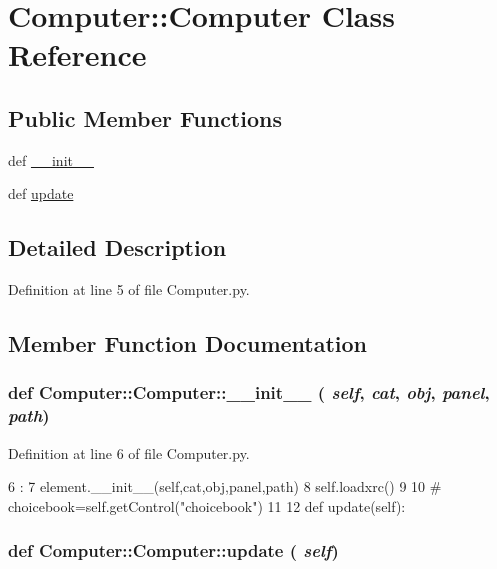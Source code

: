 \hypertarget{classComputer_1_1Computer}{
\section{Computer::Computer Class Reference}
\label{classComputer_1_1Computer}
}
\subsection*{Public Member Functions}
\begin{DoxyCompactItemize}
\item 
def \hyperlink{classComputer_1_1Computer_af3369fbe27663f0a3d17b6b4633b59fc}{\_\-\_\-init\_\-\_\-}
\item 
def \hyperlink{classComputer_1_1Computer_a17be8845c7ba7695508d05ee262c7764}{update}
\end{DoxyCompactItemize}


\subsection{Detailed Description}


Definition at line 5 of file Computer.py.

\subsection{Member Function Documentation}
\hypertarget{classComputer_1_1Computer_af3369fbe27663f0a3d17b6b4633b59fc}{
\subsubsection[{\_\-\_\-init\_\-\_\-}]{\setlength{\rightskip}{0pt plus 5cm}def Computer::Computer::\_\-\_\-init\_\-\_\- ( {\em self}, \/   {\em cat}, \/   {\em obj}, \/   {\em panel}, \/   {\em path})}}
\label{classComputer_1_1Computer_af3369fbe27663f0a3d17b6b4633b59fc}


Definition at line 6 of file Computer.py.


\begin{DoxyCode}
6                                              :
7         element.__init__(self,cat,obj,panel,path)
8         self.loadxrc()
9 
10 #        choicebook=self.getControl("choicebook")
11 
12 
    def update(self):
\end{DoxyCode}
\hypertarget{classComputer_1_1Computer_a17be8845c7ba7695508d05ee262c7764}{
\subsubsection[{update}]{\setlength{\rightskip}{0pt plus 5cm}def Computer::Computer::update ( {\em self})}}
\label{classComputer_1_1Computer_a17be8845c7ba7695508d05ee262c7764}


